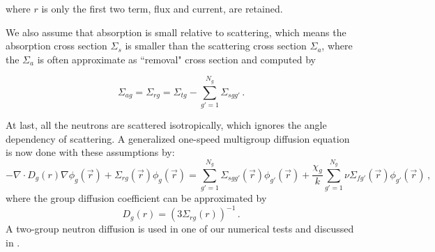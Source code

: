where $r$ is only the first two term, flux and current, are retained.

We also assume that absorption is small relative to scattering, which means the absorption cross section $\Sigma_s$ is smaller than the scattering cross section $\Sigma_a$, where the $\Sigma_a$ is often approximate as ``removal" cross section and computed by 

\begin{equation}
\Sigma_{ag} = \Sigma_{rg} = \Sigma_{tg} -  \sum\limits^{N_g}_{g'=1} \Sigma_{s g g'}\, .
 \label{eq:absorption}
\end{equation}

At last, all the neutrons are scattered isotropically, which ignores the angle dependency of scattering.
A generalized one-speed multigroup diffusion equation is now done with these assumptions by:
\begin{equation}
  -\nabla \cdot D_g(r) \nabla \phi_g(\vec{r}) + \Sigma_{r g}(\vec{r}) \phi_{g}(\vec{r}) = \sum\limits^{N_g}_{g'=1} \Sigma_{s g g'}(\vec{r}) \phi_{g'}(\vec{r}) +\frac{\chi_g}{k} \sum\limits^{N_g}_{g'=1} \nu\Sigma_{fg'}(\vec{r}) \phi_{g'}(\vec{r}) \, ,
\label{eq:diffusion}
\end{equation}
where the group diffusion coefficient can be approximated by 
\begin{equation}
   D_g(r) = (3\Sigma_{rg}(r))^{-1} \, .
\label{eq:diff_coef}
\end{equation}
A two-group neutron diffusion  is used in one of our numerical tests and discussed in .






